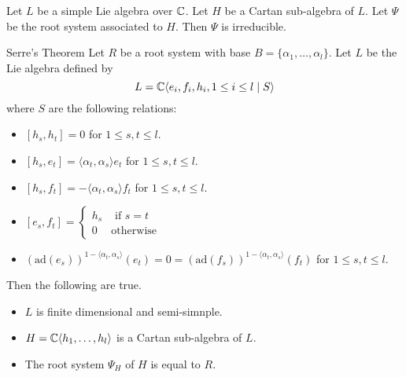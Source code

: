 \documentclass[a4paper]{article}
\begin{document}
\begin{prp}{}{} Let $L$ be a simple Lie algebra over $\mathbb{C}$. Let $H$ be a Cartan sub-algebra of $L$. Let $\Psi$ be the root system associated to $H$. Then $\Psi$ is irreducible. 
\end{prp}

\begin{thm}{Serre's Theorem}{} Let $R$ be a root system with base $B=\{\alpha_1,\dots,\alpha_l\}$. Let $L$ be the Lie algebra defined by $$L=\mathbb{C}\langle e_i,f_i,h_i, 1\leq i\leq l\;|\;S\rangle$$ where $S$ are the following relations: 
\begin{itemize}
\item $[h_s,h_t]=0$ for $1\leq s,t\leq l$. 
\item $[h_s,e_t]=\langle\alpha_t,\alpha_s\rangle e_t$ for $1\leq s,t\leq l$. 
\item $[h_s,f_t]=-\langle\alpha_t,\alpha_s\rangle f_t$ for $1\leq s,t\leq l$. 
\item $[e_s,f_t]=\begin{cases}
h_s & \text{ if } s=t\\
0 & \text{otherwise}
\end{cases}$
\item $\left(\text{ad}(e_s)\right)^{1-\langle\alpha_t,\alpha_s\rangle}(e_t)=0=\left(\text{ad}(f_s)\right)^{1-\langle\alpha_t,\alpha_s\rangle}(f_t)$ for $1\leq s,t\leq l$. 
\end{itemize}
Then the following are true. 
\begin{itemize}
\item $L$ is finite dimensional and semi-simnple. 
\item $H=\mathbb{C}\langle h_1,\dots,h_l\rangle$ is a Cartan sub-algebra of $L$. 
\item The root system $\Psi_H$ of $H$ is equal to $R$. 
\end{itemize}
\end{thm}
\end{document}
